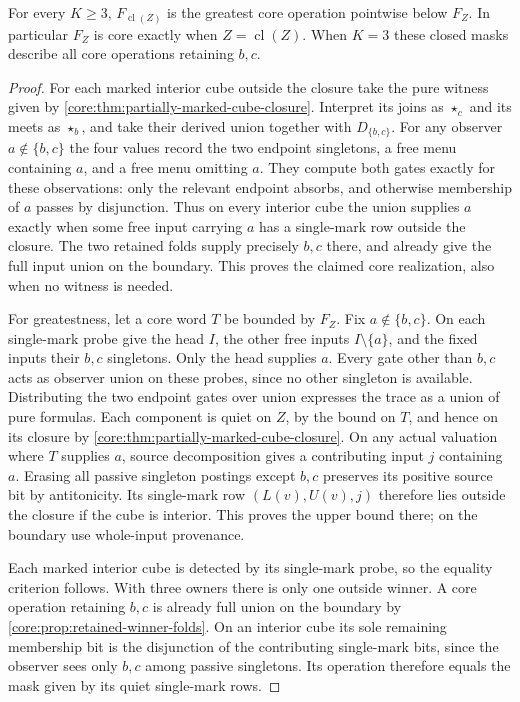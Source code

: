 \begin{corollary}
\label{core:cor:partially-marked-mask-interior}
For every $K\ge3$, $F_{\operatorname{cl}(Z)}$ is the greatest core
operation pointwise below $F_Z$. In particular $F_Z$ is core exactly
when $Z=\operatorname{cl}(Z)$. When $K=3$ these closed masks describe
all core operations retaining $b,c$.
\end{corollary}
\begin{proof}
For each marked interior cube outside the closure take the pure
witness given by \cref{core:thm:partially-marked-cube-closure}.
Interpret its joins as $\star_c$ and its meets as $\star_b$, and take
their derived union together with $D_{\{b,c\}}$. For any observer
$a\notin\{b,c\}$ the four values record the two endpoint singletons,
a free menu containing $a$, and a free menu omitting $a$. They compute
both gates exactly for these observations: only the relevant endpoint
absorbs, and otherwise membership of $a$ passes by disjunction.
Thus on every interior cube the union supplies $a$ exactly when
some free input carrying $a$ has a single-mark row outside the
closure. The two retained folds supply precisely $b,c$ there, and
already give the full input union on the boundary. This proves the
claimed core realization, also when no witness is needed.

For greatestness, let a core word $T$ be bounded by $F_Z$. Fix
$a\notin\{b,c\}$. On each single-mark probe give the head $I$,
the other free inputs $I\setminus\{a\}$, and the fixed inputs
their $b,c$ singletons. Only the head supplies $a$. Every gate
other than $b,c$ acts as observer union on these probes, since
no other singleton is available. Distributing the two endpoint
gates over union expresses the trace as a union of pure formulas.
Each component is quiet on $Z$, by the bound on $T$, and hence
on its closure by \cref{core:thm:partially-marked-cube-closure}.
On any actual valuation where $T$ supplies $a$, source decomposition
gives a contributing input $j$ containing $a$. Erasing all passive
singleton postings except $b,c$ preserves its positive source bit
by antitonicity. Its single-mark row $(L(v),U(v),j)$ therefore lies
outside the closure if the cube is interior. This proves the upper
bound there; on the boundary use whole-input provenance.

Each marked interior cube is detected by its single-mark probe, so
the equality criterion follows. With three owners there is only one
outside winner. A core operation retaining $b,c$ is already full
union on the boundary by \cref{core:prop:retained-winner-folds}.
On an interior cube its sole remaining membership bit is the
disjunction of the contributing single-mark bits, since the
observer sees only $b,c$ among passive singletons. Its operation
therefore equals the mask given by its quiet single-mark rows.
\end{proof}

